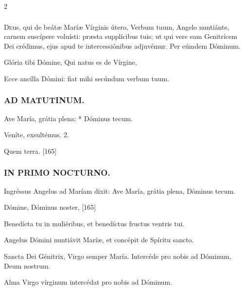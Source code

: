 \documentclass[9pt,twoside]{extarticle}
\begin{document}
\begin{multicols}{2}
\subsubsection*{\center {}}
\lettrine{D}eus, qui de beátæ Maríæ Vírginis útero, Verbum tuum, Angelo nuntiánte, carnem suscípere voluísti: præsta supplícibus tuis; ut qui vere eam Genitrícem Dei crédimus, ejus apud te intercessiónibus adjuvémur. Per eúmdem Dóminum.

\begin{tightlist}{}
\item {} Glória tibi Dómine, Qui natus es de Vírgine, 
\item {} Ecce ancílla Dómini: fiat mihi secúndum verbum tuum.
\end{tightlist}

\subsubsection*{\center \textsc{AD MATUTINUM.}}
\begin{tightlist}{}
\item {} Ave María, grátia plena: * Dóminus tecum.
\item {} Veníte, exsultémus. 2.
\item {} Quem terra. [165]
\end{tightlist}

\subsubsection*{\center \textsc{IN PRIMO NOCTURNO.}}
\begin{tightlist}{}
\item {} Ingréssus Angelus ad Maríam dixit: Ave María, grátia plena, Dóminus tecum.
\item {} Dómine, Dóminus noster,  [165]
\item {} Benedícta tu in muliéribus, et benedíctus fructus ventris tui.
\item {} Angelus Dómini nuntiávit Maríæ, et concépit de Spíritu sancto.
\item {} Sancta Dei Génitrix, Virgo semper María.  Intercéde pro nobis ad Dóminum, Deum nostrum.
\item {}
\item {\small {} Alma Virgo vírginum intercédat pro nobis ad Dóminum.}
\end{tightlist}


\end{multicols}
\end{document}
